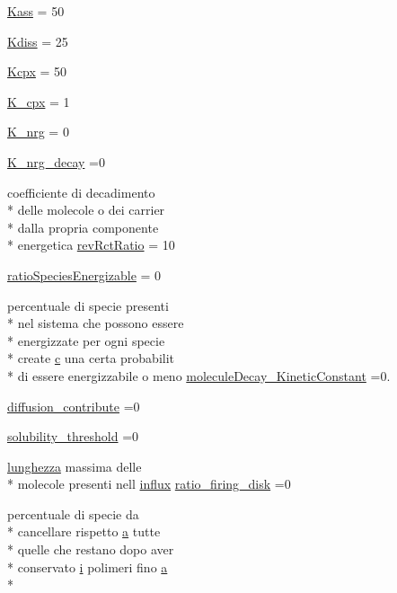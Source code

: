 \begin{DoxyCompactItemize}
\hyperlink{a00071_a484afe97369bc993daaa71613dd2a665}{Kass} = 50
\item 
\hyperlink{a00071_a51a314f9df0eaa4488a1b264d1de0173}{Kdiss} = 25
\item 
\hyperlink{a00071_aaea32371e0f1645dcea44ce4d4a3d147}{Kcpx} = 50
\item 
\hyperlink{a00071_a26dbdfeb290332837753db666ee56981}{K\-\_\-cpx} = 1
\item 
\hyperlink{a00071_ac8f2b2a8d859ca2b7cf056575c7b0538}{K\-\_\-nrg} = 0
\item 
\hyperlink{a00071_abd02c282e86e2173abc6daed03f73584}{K\-\_\-nrg\-\_\-decay} =0
\item 
coefficiente di decadimento \\*
delle molecole o dei carrier \\*
dalla propria componente \\*
energetica \hyperlink{a00071_aa7d97d27bd1a172a2f0ad49ef13ef8ac}{rev\-Rct\-Ratio} = 10
\item 
\hyperlink{a00071_a1fa680d8b3a4f885d99f56fef41d2c37}{ratio\-Species\-Energizable} = 0
\item 
percentuale di specie presenti \\*
nel sistema che possono essere \\*
energizzate per ogni specie \\*
create \hyperlink{a00035_a6be92348ba85ef257b11d06209e1d7b6}{c} una certa probabilit \\*
di essere energizzabile o meno \hyperlink{a00071_a85569bbcfd8fbc0081b5a144eaf516f5}{molecule\-Decay\-\_\-\-Kinetic\-Constant} =0.
\item 
\hyperlink{a00071_a9341167cb56ed18499df723220990b9c}{diffusion\-\_\-contribute} =0
\item 
\hyperlink{a00071_acbefa7c9bfd826fec9b32fa3bd29c288}{solubility\-\_\-threshold} =0
\item 
\hyperlink{a00064_a984d293145d85a936f430c0990316e51}{lunghezza} massima delle \\*
molecole presenti nell \hyperlink{a00065_a902e747aeec6b345d3a057099152f41f}{influx} \hyperlink{a00071_a83c1660d71068ae836121af0890bb3dd}{ratio\-\_\-firing\-\_\-disk} =0
\item 
percentuale di specie da \\*
cancellare rispetto \hyperlink{a00035_a2ffdbad9ea59541e59cbd2b938e0770c}{a} tutte \\*
quelle che restano dopo aver \\*
conservato \hyperlink{a00071_ad3efca1ea6e3333daf30719ee0501862}{i} polimeri fino \hyperlink{a00035_a2ffdbad9ea59541e59cbd2b938e0770c}{a} \\*

\end{DoxyCompactItemize}
